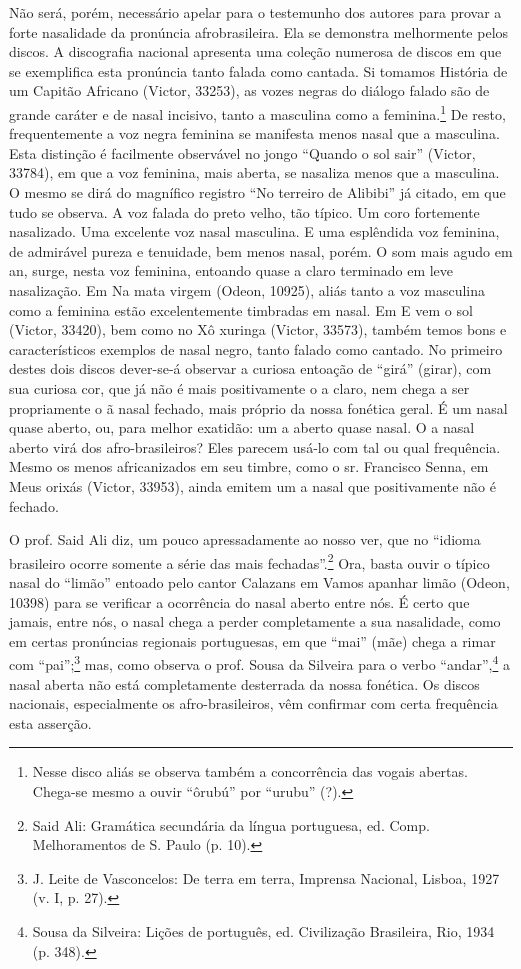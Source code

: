 Não será, porém, necessário apelar para o testemunho dos autores para
provar a forte nasalidade da pronúncia afrobrasileira. Ela se demonstra
melhormente pelos discos. A discografia nacional apresenta uma coleção
numerosa de discos em que se exemplifica esta pronúncia tanto falada
como cantada. Si tomamos História de um Capitão Africano (Victor,
33253), as vozes negras do diálogo falado são de grande caráter e de
nasal incisivo, tanto a masculina como a feminina.\footnote{Nesse disco aliás se observa também a concorrência das vogais
abertas. Chega-se mesmo a ouvir ``ôrubú'' por ``urubu'' (?).} De resto,
frequentemente a voz negra feminina se manifesta menos nasal que a
masculina. Esta distinção é facilmente observável no jongo ``Quando o
sol sair'' (Victor, 33784), em que a voz feminina, mais aberta, se
nasaliza menos que a masculina. O mesmo se dirá do magnífico registro
``No terreiro de Alibibi'' já citado, em que tudo se observa. A voz
falada do preto velho, tão típico. Um coro fortemente nasalizado. Uma
excelente voz nasal masculina. E uma esplêndida voz feminina, de
admirável pureza e tenuidade, bem menos nasal, porém. O som mais agudo
em an, surge, nesta voz feminina, entoando quase a claro terminado em
leve nasalização. Em Na mata virgem (Odeon, 10925), aliás tanto a voz
masculina como a feminina estão excelentemente timbradas em nasal. Em E
vem o sol (Victor, 33420), bem como no Xô xuringa (Victor, 33573),
também temos bons e característicos exemplos de nasal negro, tanto
falado como cantado. No primeiro destes dois discos dever-se-á observar
a curiosa entoação de ``girá'' (girar), com sua curiosa cor, que já não
é mais positivamente o a claro, nem chega a ser propriamente o ã nasal
fechado, mais próprio da nossa fonética geral. É um nasal quase aberto,
ou, para melhor exatidão: um a aberto quase nasal. O a nasal aberto virá
dos afro-brasileiros? Eles parecem usá-lo com tal ou qual frequência.
Mesmo os menos africanizados em seu timbre, como o sr. Francisco Senna,
em Meus orixás (Victor, 33953), ainda emitem um a nasal que
positivamente não é fechado.

O prof. Said Ali diz, um pouco apressadamente ao nosso ver, que no
``idioma brasileiro ocorre somente a série das mais fechadas''.\footnote{Said Ali: Gramática secundária da língua portuguesa, ed. Comp.
Melhoramentos de S. Paulo (p. 10).}
Ora, basta ouvir o típico nasal do ``limão'' entoado pelo cantor
Calazans em Vamos apanhar limão (Odeon, 10398) para se verificar a
ocorrência do nasal aberto entre nós. É certo que jamais, entre nós, o
nasal chega a perder completamente a sua nasalidade, como em certas
pronúncias regionais portuguesas, em que ``mai'' (mãe) chega a rimar com
``pai'';\footnote{J. Leite de Vasconcelos: De terra em terra, Imprensa Nacional,
Lisboa, 1927 (v. I, p. 27).} mas, como observa o prof. Sousa da Silveira para o verbo
``andar'',\footnote{Sousa da Silveira: Lições de português, ed. Civilização Brasileira,
Rio, 1934 (p. 348).} a nasal aberta não está completamente desterrada da nossa
fonética. Os discos nacionais, especialmente os afro-brasileiros, vêm
confirmar com certa frequência esta asserção.

